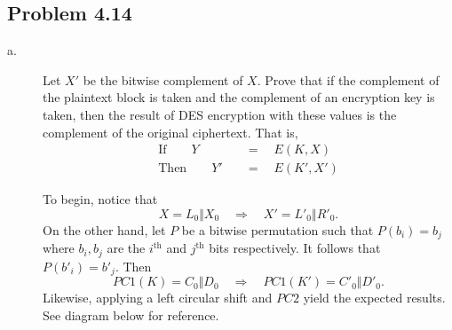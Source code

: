 \documentclass[../hw_sols.tex]{subfiles}
\begin{document}
\newpage



\subsection*{Problem 4.14}

\begin{description}

\item[a.]
Let $X'$ be the bitwise complement of $X$. Prove that if the complement of the plaintext block is taken and the complement of an encryption key is taken, then the result of DES encryption with these values is the complement of the original ciphertext. That is,
\begin{align*}
	\text{If} \qquad Y \quad &= \quad E(K, X) \\
	\text{Then} \qquad Y' \quad &= \quad E(K', X')
\end{align*}

\begin{solution}
To begin, notice that 
	$$X = L_0 \Vert X_0 \quad \Rightarrow \quad X' = L'_0 \Vert R'_0.$$
On the other hand, let $P$ be a bitwise permutation such that $P(b_i) = b_j$ where $b_i, b_j$ are the $i^{\text{th}}$ and $j^{\text{th}}$ bits respectively. It follows that $P(b'_i) = b'_j$. Then
	$$PC1(K) = C_0 \Vert D_0 \quad \Rightarrow \quad PC1(K') = C'_0 \Vert D'_0.$$
Likewise, applying a left circular shift and $PC2$ yield the expected results. See diagram below for reference.
\begin{center}
	
\end{center}


\end{solution}
\end{description}
\end{document}
